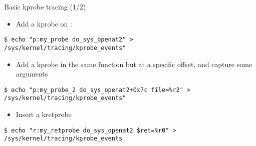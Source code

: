 \begin{frame}[fragile]{Basic kprobe tracing (1/2)}
	\begin{itemize}
		\item Add a kprobe on :
	\end{itemize}
	\begin{block}{}
		\begin{verbatim}
$ echo "p:my_probe do_sys_openat2" > /sys/kernel/tracing/kprobe_events"
		\end{verbatim}
	\end{block}
	\begin{itemize}
		\item Add a kprobe in the same function but at a specific
			offset, and capture some arguments
	\end{itemize}
	\begin{block}{}
		\begin{verbatim}
$ echo "p:my_probe_2 do_sys_openat2+0x7c file=%r2" > /sys/kernel/tracing/kprobe_events"
		\end{verbatim}
	\end{block}
	\begin{itemize}
		\item Insert a kretprobe
	\end{itemize}
	\begin{block}{}
		\begin{verbatim}
$ echo "r:my_retprobe do_sys_openat2 $ret=%r0" > /sys/kernel/tracing/kprobe_events
		\end{verbatim}
	\end{block}
\end{frame}

